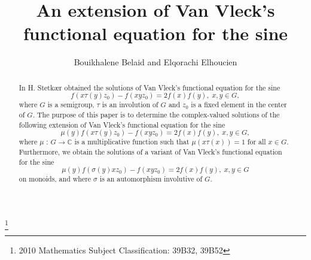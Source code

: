\documentclass[12pt]{amsart}
\theoremstyle{definition}
\theoremstyle{remark}
\numberwithin{equation}{section}
\begin{document}
\title[]{An extension of Van Vleck's functional equation for the sine}\author{Bouikhalene Belaid and Elqorachi Elhoucien}
\thanks{2010 Mathematics Subject Classification: 39B32, 39B52}
\begin{abstract}
In \cite{St3} H. Stetk\ae r obtained the solutions of Van Vleck's
functional equation for the sine $$f(x\tau(y)z_0)-f(xyz_0)
=2f(x)f(y),\; x,y\in G,$$ where $G$ is a semigroup, $\tau$ is an
involution of $G$ and $z_0$ is a fixed element in the center of $G$.
The purpose of  this paper is to determine the complex-valued
solutions of the following extension of Van Vleck's functional
equation for the sine $$\mu(y)f(x\tau(y)z_0)-f(xyz_0) =2f(x)f(y),
\;x,y\in G,$$ where $\mu$ : $G\longrightarrow \mathbb{C}$ is a
multiplicative function such that $\mu(x\tau(x))=1$ for all $x\in
G$. Furthermore, we obtain the solutions of a variant of Van Vleck's
functional equation for the sine
$$\mu(y)f(\sigma(y)xz_0)-f(xyz_0) = 2f(x)f(y),
\;x,y\in G$$ on monoids, and where $\sigma$ is an automorphism
involutive of $G$.
\end{abstract}
\maketitle
\end{document}
